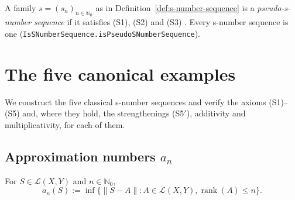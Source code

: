 \begin{definition}
\label{def:pseudo-s-number-sequence}
\leanok
{}
A family $s = (s_n)_{n \in \mathbb{N}_0}$ as in
Definition~\ref{def:s-number-sequence} is a \emph{pseudo-\textup{s}-number
sequence} if it satisfies (S1), (S2) and (S3) \cite[12.1.1]{Pietsch-ideals}.
Every s-number sequence is one
(\texttt{IsSNumberSequence.isPseudoSNumberSequence}).
\end{definition}

\chapter{The five canonical examples}
\label{ch:examples}

We construct the five classical s-number sequences and verify the
axioms (S1)--(S5) and, where they hold, the strengthenings (S5$'$),
additivity and multiplicativity, for each of them.

\section{Approximation numbers $a_n$}
\label{sec:approx}

\begin{definition}
\label{def:approximation-number}
\leanok
{}
For $S \in \mathcal{L}(X, Y)$ and $n \in \mathbb{N}_0$,
\[
a_n(S) := \inf \bigl\{ \|S - A\| : A \in \mathcal{L}(X, Y),
                       \operatorname{rank}(A) \le n \bigr\}.
\]
\end{definition}

